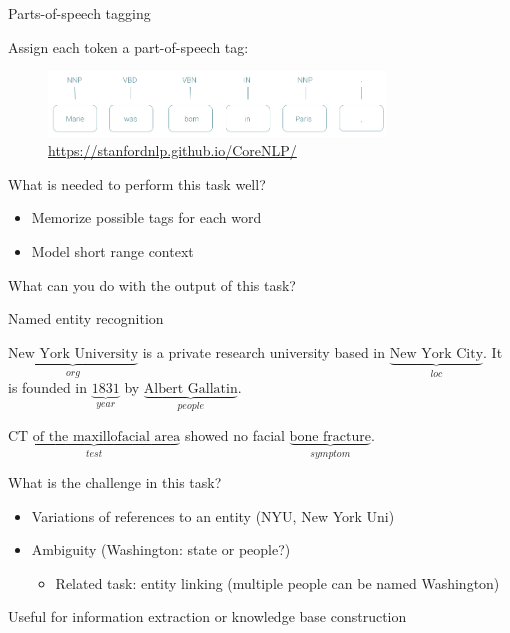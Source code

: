 \documentclass[usenames,dvipsnames,notes,11pt,aspectratio=169,hyperref={colorlinks=true, linkcolor=blue}]{beamer}
\newcommand{\pdfnote}[1]{}
\begin{document}
\begin{frame}
    {Parts-of-speech tagging}

    Assign each token a part-of-speech tag:
    \begin{figure}
        \includegraphics[width=0.8\textwidth]{figures/pos}
        \caption{\url{https://stanfordnlp.github.io/CoreNLP/}}
    \end{figure}

    What is needed to perform this task well?\\\pause
    \begin{itemize}
        \item Memorize possible tags for each word
        \item Model short range context
    \end{itemize}

    What can you do with the output of this task?
    \pdfnote{
        As features of text styles, lemmatization
    }
\end{frame}

\begin{frame}
    {Named entity recognition}

        {
            $\underbrace{\text{New York University}}_{{\textstyle org}}$ is a private research university based in $\underbrace{\text{New York City}}_{{\textstyle loc}}$.
            It is founded in $\underbrace{\text{1831}}_{{\textstyle year}}$ by $\underbrace{\text{Albert Gallatin}}_{{\textstyle people}}$.\par
            \pause
            $\underbrace{\text{CT of the maxillofacial area}}_{{\textstyle test}}$ showed no facial $\underbrace{\text{bone fracture}}_{{\textstyle symptom}}$.\par
        }

        What is the challenge in this task?\\\pause
        \begin{itemize}
            \item Variations of references to an entity (NYU, New York Uni)
            \item Ambiguity (Washington: state or people?)
                \begin{itemize}
            \item Related task: entity linking (multiple people can be named Washington)
                \end{itemize}
        \end{itemize}

        \pause\medskip
        Useful for information extraction or knowledge base construction
\end{frame}
\end{document}
